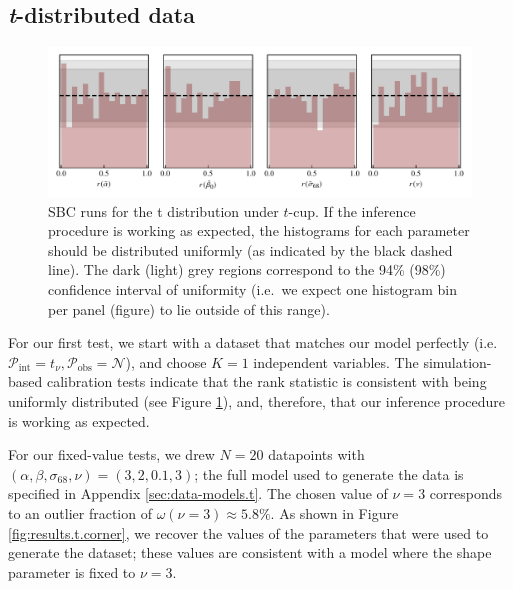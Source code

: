 \documentclass[fleqn,usenatbib]{rasti}
\begin{document}

\subsection{\textit{t}-distributed data}
\label{sec:results.t}

\begin{figure}
    \includegraphics[width=\textwidth]{graphics/sbc/tcup_sbc.pdf}
    \caption{SBC runs for the t distribution under $t$-cup. If the inference
    procedure is working as expected, the histograms for each parameter should
    be distributed uniformly (as indicated by the black dashed line). The dark
    (light) grey regions correspond to the 94\% (98\%) confidence interval of
    uniformity (i.e.\ we expect one histogram bin per panel (figure) to lie
    outside of this range).}
    \label{fig:results.t.sbc}
\end{figure}

For our first test, we start with a dataset that matches our model perfectly
(i.e.\ $\mathcal P_{\text{int}} = t_\nu, \mathcal P_{\text{obs}} =
\mathcal{N}$), and choose $K=1$ independent variables. The simulation-based
calibration tests indicate that the rank statistic is consistent with being
uniformly distributed (see Figure \ref{fig:results.t.sbc}), and, therefore, that
our inference procedure is working as expected.

For our fixed-value tests, we drew $N = 20$ datapoints with $(\alpha, \beta,
\sigma_{68}, \nu) = (3, 2, 0.1, 3)$; the full model used to generate the data is
specified in Appendix \ref{sec:data-models.t}. The chosen value of $\nu = 3$
corresponds to an outlier fraction of $\omega(\nu = 3) \approx 5.8 \%$.  As
shown in Figure \ref{fig:results.t.corner}, we recover the values of the
parameters that were used to generate the dataset; these values are consistent
with a model where the shape parameter is fixed to $\nu = 3$.
\end{document}
